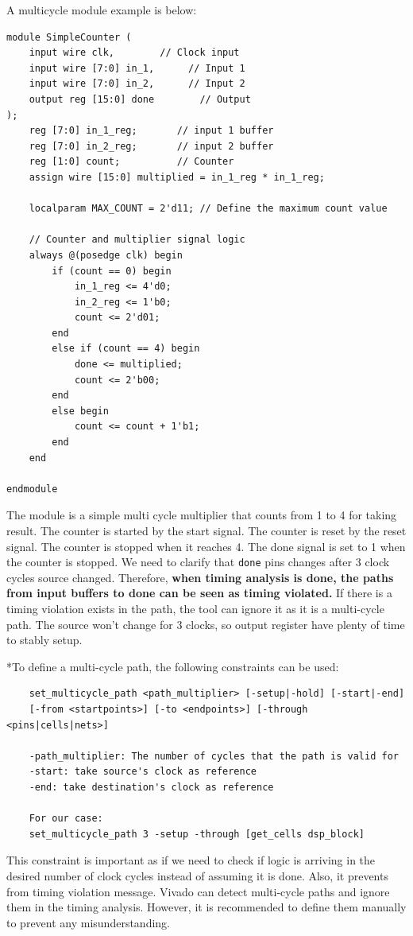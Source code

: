 \documentclass{report}
\begin{document}
A multicycle module example is below:
\begin{verbatim}
module SimpleCounter (
    input wire clk,        // Clock input
    input wire [7:0] in_1,      // Input 1
    input wire [7:0] in_2,      // Input 2
    output reg [15:0] done        // Output
);
    reg [7:0] in_1_reg;       // input 1 buffer
    reg [7:0] in_2_reg;       // input 2 buffer
    reg [1:0] count;          // Counter
    assign wire [15:0] multiplied = in_1_reg * in_1_reg;
    
    localparam MAX_COUNT = 2'd11; // Define the maximum count value

    // Counter and multiplier signal logic
    always @(posedge clk) begin
        if (count == 0) begin
            in_1_reg <= 4'd0;
            in_2_reg <= 1'b0;
            count <= 2'd01;
        end
        else if (count == 4) begin
            done <= multiplied;
            count <= 2'b00;
        end
        else begin
            count <= count + 1'b1;
        end
    end

endmodule
\end{verbatim}
The module is a simple multi cycle multiplier that counts from 1 to 4 for taking result. The counter is started by the start signal. The counter is reset by the reset signal. The counter is stopped when it reaches 4. The done signal is set to 1 when the counter is stopped. 
We need to clarify that \texttt{done} pins changes after 3 clock cycles source changed. Therefore, \textbf{when timing analysis is done, the paths from input buffers to done can be seen as timing violated.} If there is a timing violation exists in the path, the tool can ignore it as it is a multi-cycle path. The source won't change for 3 clocks, so output register have plenty of time to stably setup.

*To define a multi-cycle path, the following constraints can be used:
\begin{verbatim}
    set_multicycle_path <path_multiplier> [-setup|-hold] [-start|-end]
    [-from <startpoints>] [-to <endpoints>] [-through <pins|cells|nets>]

    -path_multiplier: The number of cycles that the path is valid for
    -start: take source's clock as reference
    -end: take destination's clock as reference

    For our case:
    set_multicycle_path 3 -setup -through [get_cells dsp_block]
\end{verbatim}
    This constraint is important as if we need to check if logic is arriving in the desired number of clock cycles instead of assuming it is done. Also, it prevents from timing violation message. Vivado can detect multi-cycle paths and ignore them in the timing analysis. However, it is recommended to define them manually to prevent any misunderstanding.
\end{document}
